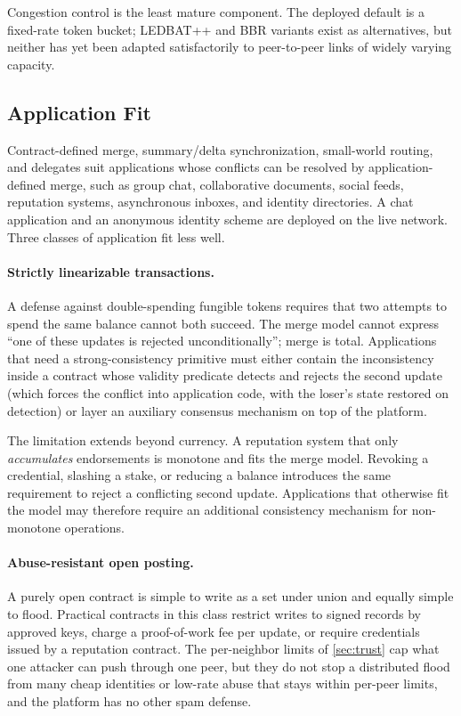 Congestion control is the least mature component. The deployed default is a fixed-rate token bucket; LEDBAT++ and BBR variants exist as alternatives, but neither has yet been adapted satisfactorily to peer-to-peer links of widely varying capacity.

\subsection{Application Fit}

Contract-defined merge, summary/delta synchronization, small-world routing, and delegates suit applications whose conflicts can be resolved by application-defined merge, such as group chat, collaborative documents, social feeds, reputation systems, asynchronous inboxes, and identity directories. A chat application \citep{river} and an anonymous identity scheme \citep{ghostkey} are deployed on the live network. Three classes of application fit less well.

\paragraph{Strictly linearizable transactions.} A defense against double-spending fungible tokens requires that two attempts to spend the same balance cannot both succeed. The merge model cannot express ``one of these updates is rejected unconditionally''; merge is total. Applications that need a strong-consistency primitive must either contain the inconsistency inside a contract whose validity predicate detects and rejects the second update (which forces the conflict into application code, with the loser's state restored on detection) or layer an auxiliary consensus mechanism on top of the platform.

The limitation extends beyond currency. A reputation system that only \emph{accumulates} endorsements is monotone and fits the merge model. Revoking a credential, slashing a stake, or reducing a balance introduces the same requirement to reject a conflicting second update. Applications that otherwise fit the model may therefore require an additional consistency mechanism for non-monotone operations.

\paragraph{Abuse-resistant open posting.} A purely open contract is simple to write as a set under union and equally simple to flood. Practical contracts in this class restrict writes to signed records by approved keys, charge a proof-of-work fee per update, or require credentials issued by a reputation contract. The per-neighbor limits of \cref{sec:trust} cap what one attacker can push through one peer, but they do not stop a distributed flood from many cheap identities or low-rate abuse that stays within per-peer limits, and the platform has no other spam defense.


